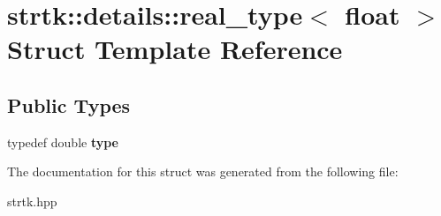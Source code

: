 \hypertarget{structstrtk_1_1details_1_1real__type_3_01float_01_4}{\section{strtk\-:\-:details\-:\-:real\-\_\-type$<$ float $>$ Struct Template Reference}
\label{structstrtk_1_1details_1_1real__type_3_01float_01_4}
}
\subsection*{Public Types}
\begin{DoxyCompactItemize}
\item 
\hypertarget{structstrtk_1_1details_1_1real__type_3_01float_01_4_a821fdbee30fb0fbca75d97581e1d291e}{typedef double {\bfseries type}}\label{structstrtk_1_1details_1_1real__type_3_01float_01_4_a821fdbee30fb0fbca75d97581e1d291e}

\end{DoxyCompactItemize}


The documentation for this struct was generated from the following file\-:\begin{DoxyCompactItemize}
\item 
strtk.\-hpp\end{DoxyCompactItemize}
